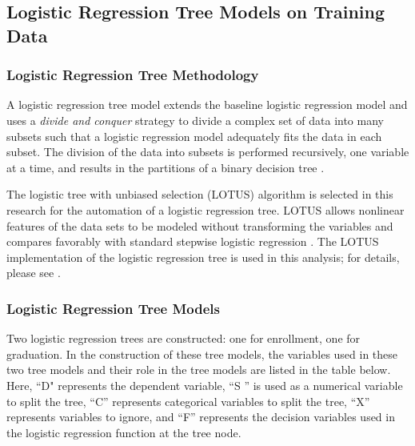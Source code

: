\documentclass[12pt,english]{report}
\begin{document}
\subsection{Logistic Regression Tree Models on Training Data }
\subsubsection{Logistic Regression Tree Methodology }
A logistic regression tree model extends the baseline logistic regression  model and uses a \textit{divide and conquer} strategy to divide a complex set 
of data into many subsets such that a logistic regression model adequately fits the data in each subset. The division of the data into subsets is  performed recursively, one variable at a time, and results in the partitions of a binary decision tree \citep{harrell2013regression_book}.

The logistic tree with unbiased selection (LOTUS) algorithm \citep{lotus2}  is  selected in this research for the automation of a logistic regression tree. 
LOTUS allows  nonlinear features of the data sets to be modeled without  transforming the variables and compares favorably with standard stepwise 
logistic regression \citep{lotus_app1,lotus_app2}. The LOTUS implementation of the logistic regression tree is used in this analysis; for details, please see \citep{lotus2}.

\subsubsection{Logistic Regression Tree Models }
Two logistic regression trees are constructed: one for  enrollment, one for graduation.  In the construction of these tree models, the variables used in these two tree models and their role in the tree models  are listed in the table below. Here, ``D" represents the dependent variable, ``S '' is 
used as a numerical variable to split the tree, ``C'' represents categorical  variables to split the tree, ``X'' represents variables to ignore, and ``F'' represents the decision variables used in the 
logistic regression function at the tree node. 
\end{document}
